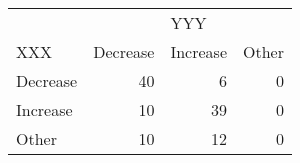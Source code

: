 \begin{table}[!h]
\centering
\begin{tabular}{lrrr}
\toprule
\multicolumn{1}{c}{ } & \multicolumn{3}{c}{YYY} \\
\cmidrule(l{3pt}r{3pt}){2-4}
XXX & Decrease & Increase & Other\\
\midrule
Decrease & 40 & 6 & 0\\
Increase & 10 & 39 & 0\\
Other & 10 & 12 & 0\\
\bottomrule
\end{tabular}
\end{table}
